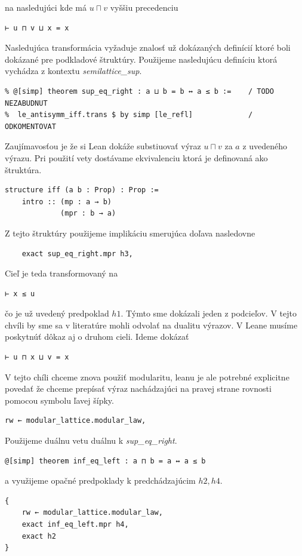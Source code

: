 \documentclass[a4paper,10pt,oneside]{report}%
\begin{document}
na nasledujúci kde má $u \sqcap v$ vyššiu precedenciu
\begin{lstlisting}
⊢ u ⊓ v ⊔ x = x
\end{lstlisting}
    Nasledujúca transformácia vyžaduje znalosť už dokázaných definícií ktoré
boli dokázané pre podkladové štruktúry. Použijeme nasledujúcu definíciu ktorá vychádza
z kontextu \emph{semilattice\_sup}.
\begin{lstlisting}
% @[simp] theorem sup_eq_right : a ⊔ b = b ↔ a ≤ b :=    / TODO NEZABUDNUT
%  le_antisymm_iff.trans $ by simp [le_refl]             / ODKOMENTOVAT
    \end{lstlisting}
    Zaujímavosťou je že si Lean dokáže substiuovať výraz $u \sqcap v$ za $a$ z uvedeného
výrazu. Pri použití vety dostávame ekvivalenciu ktorá je definovaná ako štruktúra.
\begin{lstlisting}
structure iff (a b : Prop) : Prop :=
    intro :: (mp : a → b)
             (mpr : b → a)
\end{lstlisting}
Z tejto štruktúry použijeme implikáciu smerujúca doľava nasledovne
\begin{lstlisting}
    exact sup_eq_right.mpr h3,
\end{lstlisting}
    Cieľ je teda transformovaný na
\begin{lstlisting}
⊢ x ≤ u
\end{lstlisting}
čo je už uvedený predpoklad $h1$. Týmto sme dokázali jeden z podcieľov.
    V tejto chvíli by sme sa v literatúre mohli odvolať na dualitu výrazov.
    V Leane musíme poskytnúť dôkaz aj o druhom cieli. Ideme dokázať
\begin{lstlisting}
⊢ u ⊓ x ⊔ v = x
\end{lstlisting}
V tejto chíli chceme znova použiť modularitu, leanu je ale potrebné explicitne povedať
    že chceme prepísať výraz nachádzajúci na pravej strane rovnosti pomocou symbolu
ľavej šípky.
\begin{lstlisting}
rw ← modular_lattice.modular_law,
\end{lstlisting}
    Použijeme duálnu vetu
    duálnu k \emph{sup\_eq\_right}.
\begin{lstlisting}
@[simp] theorem inf_eq_left : a ⊓ b = a ↔ a ≤ b
\end{lstlisting}
    a využijeme opačné predpoklady k predchádzajúcim $h2, h4$.
\begin{lstlisting}
{
    rw ← modular_lattice.modular_law,
    exact inf_eq_left.mpr h4,
    exact h2
}
\end{lstlisting}
\end{document}
